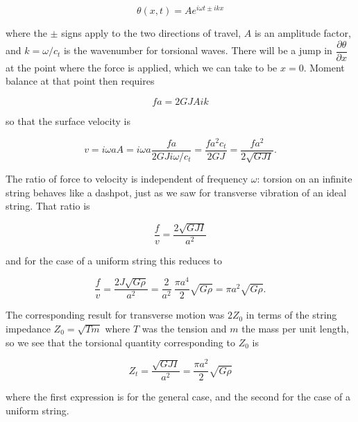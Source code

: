   \begin{equation*}\theta(x,t)= A e^{i \omega t \pm i k x} 
  \tag{7}\end{equation*} 

  \noindent{}where the $\pm$ signs apply to the two directions of travel, $A$ 
  is an amplitude factor, and $k=\omega /c_t$ is the wavenumber for torsional 
  waves. There will be a jump in $\dfrac{\partial \theta}{\partial x}$ at the 
  point where the force is applied, which we can take to be $x=0$. Moment 
  balance at that point then requires 

  \begin{equation*}fa=2 G J A i k \tag{8}\end{equation*} 

  \noindent{}so that the surface velocity is 

  \begin{equation*}v = i \omega a A = i \omega a \dfrac{fa}{2GJ i \omega 
  /c_t}=\dfrac{f a^2 c_t}{2GJ}=\dfrac{fa^2}{2 \sqrt{GJI}} . 
  \tag{9}\end{equation*} 

  The ratio of force to velocity is independent of frequency $\omega$: torsion 
  on an infinite string behaves like a dashpot, just as we saw for transverse 
  vibration of an ideal string. That ratio is 

  \begin{equation*}\dfrac{f}{v}=\dfrac{2 \sqrt{GJI}}{a^2} 
  \tag{10}\end{equation*} 

  \noindent{}and for the case of a uniform string this reduces to 

  \begin{equation*}\dfrac{f}{v}=\dfrac{2 
  J\sqrt{G\rho}}{a^2}=\dfrac{2}{a^2}~\dfrac{\pi a^4}{2} \sqrt{G \rho}=\pi a^2 
  \sqrt{G\rho} . \tag{11}\end{equation*} 

  The corresponding result for transverse motion was $2 Z_0$ in terms of the 
  string impedance $Z_0=\sqrt{T m}$ where $T$ was the tension and $m$ the mass 
  per unit length, so we see that the torsional quantity corresponding to $Z_0$ 
  is 

  \begin{equation*}Z_t=\dfrac{\sqrt{GJI}}{a^2}=\dfrac{\pi a^2}{2} \sqrt{G\rho} 
  \tag{12}\end{equation*} 

  \noindent{}where the first expression is for the general case, and the second 
  for the case of a uniform string. 

